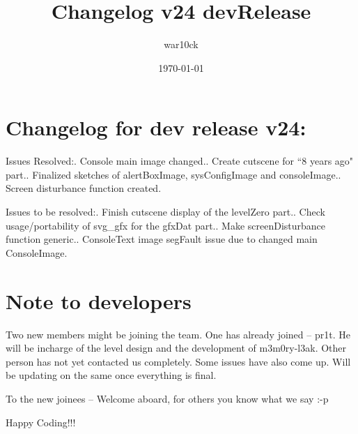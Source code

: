 \documentclass[a4paper]{article}
\begin{document}
\title{Changelog v24 devRelease}	%
\author{war10ck}	%
\date{\today}
\maketitle

\section{Changelog for dev release v24:}
Issues Resolved:. Console main image changed.. Create cutscene for ``8 years ago" part.. Finalized sketches of alertBoxImage, sysConfigImage and consoleImage.. Screen disturbance function created.\newline

Issues to be resolved:. Finish cutscene display of the levelZero part.. Check usage/portability of svg\_gfx for the gfxDat part.. Make screenDisturbance function generic.. ConsoleText image segFault issue due to changed main ConsoleImage.\newline

\section{Note to developers}
Two new members might be joining the team. One has already joined -- pr1t. He will be incharge of the level design and the development of m3m0ry-l3ak. Other person has not yet contacted us completely. Some issues have also come up. Will be updating on the same once everything is final.\newline

To the new joinees -- Welcome aboard, for others you know what we say :-p\newline

Happy Coding!!!\newline
\pagebreak
\end{document}
